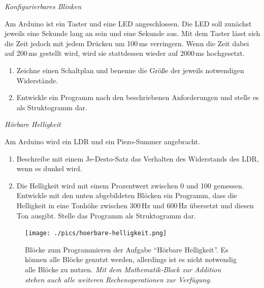 \begin{aufgabe} \emph{Konfigurierbares Blinken} \label{aufg:konfigurierbares-blinken}
	
	Am Arduino ist ein Taster und eine LED angeschlossen. Die LED soll zunächst jeweils eine Sekunde lang an sein und eine Sekunde aus. Mit dem Taster lässt sich die Zeit jedoch mit jedem Drücken um 100\,ms verringern. Wenn die Zeit dabei auf 200\,ms gestellt wird, wird sie stattdessen wieder auf 2000\,ms hochgesetzt.
	\begin{enumerate}[label=\alph*), itemsep=0ex]
		\item Zeichne einen Schaltplan und benenne die Größe der jeweils notwendigen Widerstände.
		\item Entwickle ein Programm nach den beschriebenen Anforderungen und stelle es als Struktogramm dar.
	\end{enumerate}
	
\end{aufgabe}

\begin{aufgabe} \emph{Hörbare Helligkeit} \label{aufg:hoerbare-helligkeit}
	
	Am Arduino wird ein LDR und ein Piezo-Summer angebracht.
	
	\begin{enumerate}[label=\alph*), itemsep=0ex]
		\item Beschreibe mit einem Je-Desto-Satz das Verhalten des Widerstands des LDR, wenn es dunkel wird.
		\item Die Helligkeit wird mit einem Prozentwert zwischen 0 und 100 gemessen. Entwickle mit den unten abgebildeten Blöcken ein Programm, dass die Helligkeit in eine Tonhöhe zwischen 300\,Hz und 600\,Hz übersetzt und diesen Ton ausgibt. Stelle das Programm als Struktogramm dar.
	\end{enumerate}
	
	\begin{figure}[H]
		\centering
		\texttt{[image: ./pics/hoerbare-helligkeit.png]}
		\caption{Blöcke zum Programmieren der Aufgabe \enquote{Hörbare Helligkeit}. Es können alle Blöcke genutzt werden, allerdings ist es nicht notwendig alle Blöcke zu nutzen. \emph{Mit dem Mathematik-Block zur Addition stehen auch alle weiteren Rechenoperationen zur Verfügung}.}
	\end{figure}
\end{aufgabe}

\bigskip
\newpage

